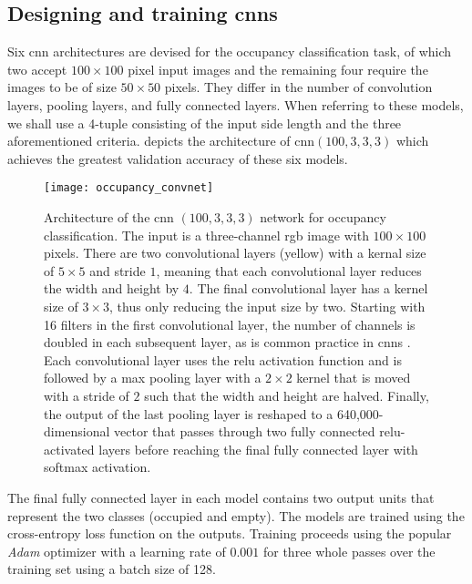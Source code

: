 \documentclass[../main.tex]{subfiles}
\begin{document}
\subsection{Designing and training \glspl{cnn}}
\label{sec:occupancy_cnns}
Six \gls{cnn} architectures are devised for the occupancy classification task, of which two accept $100\times 100$ pixel input images and the remaining four require the images to be of size $50\times 50$ pixels.
They differ in the number of convolution layers, pooling layers, and fully connected layers.
When referring to these models, we shall use a 4-tuple consisting of the input side length and the three aforementioned criteria.
 depicts the architecture of \gls{cnn}$(100, 3, 3, 3)$ which achieves the greatest validation accuracy of these six models.
\begin{figure}
    \centering
    \texttt{[image: occupancy\_convnet]}
    \caption[Architecture of the CNN $(100,3,3,3)$ network for occupancy classification.]{
        Architecture of the \gls{cnn} $(100,3,3,3)$ network for occupancy classification.
        The input is a three-channel \gls{rgb} image with $100\times 100$ pixels.
        There are two convolutional layers (yellow) with a kernal size of $5 \times 5$ and stride $1$, meaning that each convolutional layer reduces the width and height by $4$.
        The final convolutional layer has a kernel size of $3 \times 3$, thus only reducing the input size by two.
        Starting with 16 filters in the first convolutional layer, the number of channels is doubled in each subsequent layer, as is common practice in \glspl{cnn} \cite{simonyan2015}.
        Each convolutional layer uses the \gls{relu} activation function and is followed by a max pooling layer with a $2\times 2$ kernel that is moved with a stride of $2$ such that the width and height are halved.
        Finally, the output of the last pooling layer is reshaped to a 640,000-dimensional vector that passes through two fully connected \gls{relu}-activated layers before reaching the final fully connected layer with softmax activation.
    }
    \label{fig:occupancy_convnet}
\end{figure}
The final fully connected layer in each model contains two output units that represent the two classes (occupied and empty).
The models are trained using the cross-entropy loss function on the outputs.
Training proceeds using the popular \emph{Adam} optimizer \cite{kingma2017} with a learning rate of $0.001$ for three whole passes over the training set using a batch size of 128.
\end{document}
